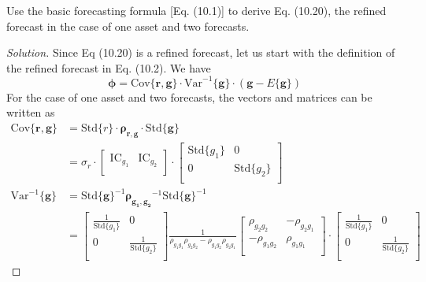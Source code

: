 \begin{problem}{10.3}
  Use the basic forecasting formula [Eq. (10.1)] to derive Eq. (10.20), the refined forecast in the case of one asset and two forecasts.
\end{problem}

\begin{proof}[Solution]
  Since Eq (10.20) is a refined forecast, let us start with the definition of the refined forecast in Eq. (10.2). We have
  \begin{equation*}
    \bm{\phi}=\mathrm{Cov}\{\bm{r},\bm{g}\}\cdot\mathrm{Var}^{-1}\{\bm{g}\}\cdot(\bm{g}-E\{\bm{g}\})
  \end{equation*}
  For the case of one asset and two forecasts, the vectors and matrices can be written as
  \begin{align*}
   \mathrm{Cov}\{\bm{r},\bm{g}\}&=\mathrm{Std}\{r\}\cdot \bm{\rho_{r,g}}\cdot\mathrm{Std}\{\bm{g}\}\\
				&= \sigma_{r}\cdot
				 \begin{bmatrix}
				  \mathrm{IC}_{g_{1}} & \mathrm{IC}_{g_{2}} \\
				 \end{bmatrix}
				\cdot\begin{bmatrix}
				   \mathrm{Std}\{g_{1}\}	&	0 			\\
				   0				&	\mathrm{Std}\{g_{2}\}   \\
				  \end{bmatrix}\\
    \mathrm{Var}^{-1}\{\bm{g}\}&=\mathrm{Std}\{\bm{g}\}^{-1}\bm{\rho_{g_{1},g_{2}}}^{-1}\mathrm{Std}\{\bm{g}\}^{-1}\\
			       &=\begin{bmatrix}
				   \frac{1}{\mathrm{Std}\{g_{1}\}}	&	0 			\\
				   0				&	\frac{1}{\mathrm{Std}\{g_{2}\}}   \\
				  \end{bmatrix}
				  \frac{1}{\rho_{g_{1}g_{1}}\rho_{g_{2}g_{2}}-\rho_{g_{1}g_{2}}\rho_{g_{2}g_{1}}}
				  \begin{bmatrix}
				   \rho_{g_{2}g_{2}}	&	-\rho_{g_{2}g_{1}}   \\
				   -\rho_{g_{1}g_{2}}	&	 \rho_{g_{1}g_{1}}   \\
				  \end{bmatrix}
				  \cdot\begin{bmatrix}
				   \frac{1}{\mathrm{Std}\{g_{1}\}}	&	0 			\\
				   0				&	\frac{1}{\mathrm{Std}\{g_{2}\}}   \\

\end{bmatrix}
\end{align*}
\end{proof}

